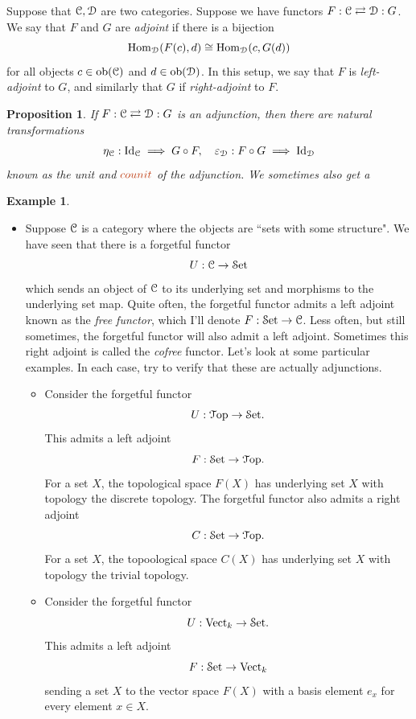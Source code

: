 \documentclass[10pt]{amsart}
\newcommand{\euscr}[1]{\EuScript{#1}}
\newtheorem{proposition}[thm]{Proposition}
\theoremstyle{definition}
\newtheorem{ex}[thm]{Example}
\newcommand{\cdef}[1]{\textcolor{Bittersweet}{#1}}
\begin{document}
Suppose that $\euscr{C}, \euscr{D}$ are two categories. Suppose we have functors $F:\euscr{C} \rightleftarrows \euscr{D}: G$. We say that $F$ and $G$ are \cdef{\emph{adjoint}} if there is a bijection
\[\text{Hom}_{\euscr{D}}(F(c), d) \cong \text{Hom}_{\euscr{D}}(c, G(d))\]
for all objects $c \in \text{ob}(\euscr{C})$ and $d \in \text{ob}(\euscr{D})$. In this setup, we say that $F$ is \cdef{\emph{left-adjoint}} to $G$, and similarly that $G$ if \cdef{\emph{right-adjoint}} to $F$.

\begin{proposition}
    If $F:\euscr{C} \rightleftarrows \euscr{D}:G$ is an adjunction, then there are natural transformations
    \[\eta_\euscr{C}: \textup{Id}_{\euscr{C}} \implies G \circ F, \quad \varepsilon_{\euscr{D}}:F \circ G \implies \textup{Id}_{\euscr{D}}\]
    known as the \cdef{unit} and $\cdef{counit}$ of the adjunction. We sometimes also get a 
\end{proposition}

\begin{ex}
    \hfill
    \begin{itemize}
        \item Suppose $\euscr{C}$ is a category where the objects are ``sets with some structure". We have seen that there is a forgetful functor
        \[U:\euscr{C} \to \euscr{S}\textup{et}\]
        which sends an object of $\euscr{C}$ to its underlying set and morphisms to the underlying set map. Quite often, the forgetful functor admits a left adjoint known as the \cdef{\emph{free functor}}, which I'll denote $F:\euscr{S}\text{et} \to \euscr{C}$. Less often, but still sometimes, the forgetful functor will also admit a left adjoint. Sometimes this right adjoint is called the \cdef{\emph{cofree}} functor. Let's look at some particular examples. In each case, try to verify that these are actually adjunctions.
        \begin{itemize}
            \item Consider the forgetful functor
            \[U:\euscr{T}\text{op} \to \euscr{S}\text{et}.\]
            This admits a left adjoint \[F:\euscr{S}\text{et} \to \euscr{T}\text{op}.\] For a set $X$, the topological space $F(X)$ has underlying set $X$ with topology the discrete topology. The forgetful functor also admits a right adjoint
            \[C:\euscr{S}\text{et} \to \euscr{T}\text{op}.\]
            For a set $X$, the topoological space $C(X)$ has underlying set $X$ with topology the trivial topology.
            \item Consider the forgetful functor
            \[U:\text{Vect}_k \to \euscr{S}\text{et}.\]
            This admits a left adjoint
            \[F:\euscr{S}\text{et} \to \text{Vect}_k\]
            sending a set $X$ to the vector space $F(X)$ with a basis element $e_x$ for every element $x \in X$.
        \end{itemize}
    \end{itemize}
\end{ex}
\end{document}
